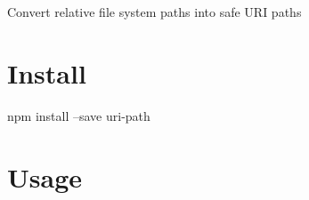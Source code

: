 \href{https://npmjs.org/package/uri-path}{\tt } \href{https://travis-ci.org/UltCombo/uri-path}{\tt } \href{https://david-dm.org/UltCombo/uri-path#info=devDependencies}{\tt }

Convert relative file system paths into safe U\+RI paths

\section*{Install}


\begin{DoxyCode}
npm install --save uri-path
\end{DoxyCode}


\section*{Usage}


 
